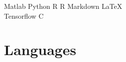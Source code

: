 \documentclass[letterpaper]{deedy-resume} %
\begin{document}
\begin{minipage}[t]{0.33\textwidth}
Matlab \textbullet{} Python \textbullet{} R \textbullet{} R Markdown \textbullet{} \LaTeX\ \\ 
Tensorflow \textbullet{} C\\

\sectionspace %


\section{Languages}

\sectionspace %


\end{minipage} %
\hfill
%
%
\end{document}
